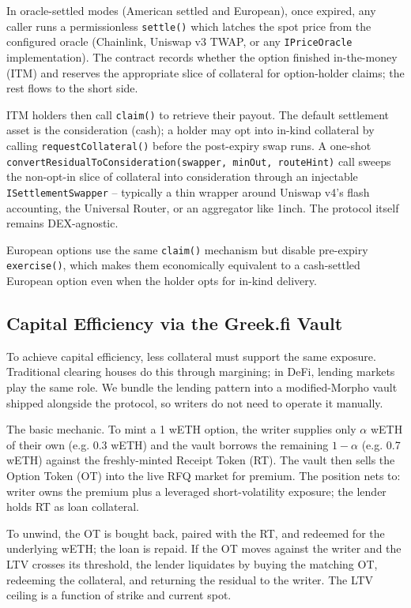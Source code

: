 \documentclass[%
 reprint,
 amsmath,amssymb,
 aps,
 prl,
floatfix,
]{revtex4-2}
\newcommand{\greekfi}{Greek.fi }
\begin{document}
In oracle-settled modes (American settled and European), once expired, any caller
runs a permissionless \texttt{settle()} which latches the spot price from the configured oracle
(Chainlink, Uniswap v3 TWAP, or any \texttt{IPriceOracle} implementation). The contract
records whether the option finished in-the-money (ITM) and reserves the appropriate
slice of collateral for option-holder claims; the rest flows to the short side.

ITM holders then call \texttt{claim()} to retrieve their payout. The default settlement
asset is the consideration (cash); a holder may opt into in-kind collateral by calling
\texttt{requestCollateral()} before the post-expiry swap runs. A one-shot
\texttt{convertResidualToConsideration(swapper, minOut, routeHint)} call sweeps the
non-opt-in slice of collateral into consideration through an injectable
\texttt{ISettlementSwapper} -- typically a thin wrapper around Uniswap v4's flash
accounting, the Universal Router, or an aggregator like 1inch. The protocol itself
remains DEX-agnostic.

European options use the same \texttt{claim()} mechanism but disable pre-expiry
\texttt{exercise()}, which makes them economically equivalent to a cash-settled European
option even when the holder opts for in-kind delivery.

\subsection{Capital Efficiency via the \greekfi Vault}

To achieve capital efficiency, less collateral must support the same exposure.
Traditional clearing houses do this through margining; in DeFi, lending markets
play the same role. We bundle the lending pattern into a modified-Morpho vault
shipped alongside the protocol, so writers do not need to operate it manually.

The basic mechanic. To mint a 1 wETH option, the writer supplies only $\alpha$ wETH
of their own (e.g. 0.3 wETH) and the vault borrows the remaining $1 - \alpha$
(e.g. 0.7 wETH) against the freshly-minted Receipt Token (RT). The vault then
sells the Option Token (OT) into the live RFQ market for premium. The position
nets to: writer owns the premium plus a leveraged short-volatility exposure;
the lender holds RT as loan collateral.

To unwind, the OT is bought back, paired with the RT, and redeemed for the underlying
wETH; the loan is repaid. If the OT moves against the writer and the LTV crosses
its threshold, the lender liquidates by buying the matching OT, redeeming the
collateral, and returning the residual to the writer. The LTV ceiling is a function
of strike and current spot.
\end{document}
